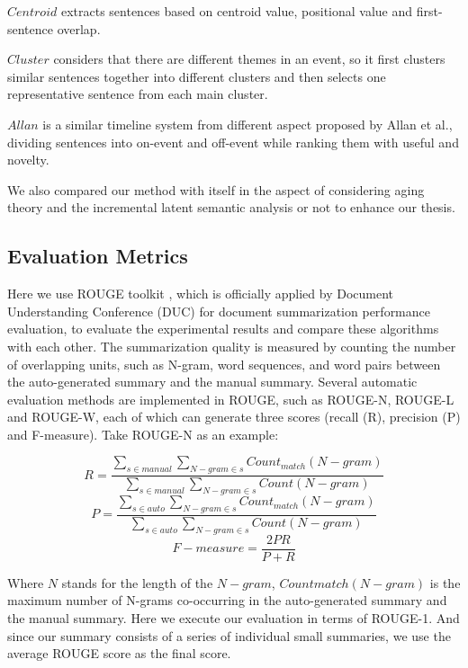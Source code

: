 \documentclass[runningheads,a4paper]{llncs}
\begin{document}
$Centroid$ extracts sentences based on centroid value, positional value and first-sentence overlap.

$Cluster$ considers that there are different themes in an event, so it first clusters similar sentences together into different clusters and then selects one representative sentence from each main cluster.

$Allan$ is a similar timeline system from different aspect proposed by Allan et al., dividing sentences into on-event and off-event while ranking them with useful and novelty.

We also compared our method with itself in the aspect of considering aging theory and the incremental latent semantic analysis or not to enhance our thesis.

\subsection{Evaluation Metrics}
Here we use ROUGE toolkit \cite{2004-Lin-p74-81} , which is officially applied by Document Understanding Conference (DUC) for document summarization performance evaluation, to evaluate the experimental results and compare these algorithms with each other. The summarization quality is measured by counting the number of overlapping units, such as N-gram, word sequences, and word pairs between the auto-generated summary and the manual summary. Several automatic evaluation methods are implemented in ROUGE, such as ROUGE-N, ROUGE-L and ROUGE-W, each of which can generate three scores (recall (R), precision (P) and F-measure). Take ROUGE-N as an example:

\begin{equation}
R=\frac{\sum_{s \in manual } \sum_{N-gram \in s} Count_{match}(N-gram) } { \sum_{s \in manual} \sum_{N-gram \in s} Count(N-gram)  } \end{equation}
\begin{equation}
P=\frac{\sum_{s \in auto } \sum_{N-gram \in s} Count_{match}(N-gram) } { \sum_{s \in auto} \sum_{N-gram \in s} Count(N-gram)  }
\end{equation}
\begin{equation}
F-measure = \frac{2PR}{P+R}
\end{equation}

Where $N$ stands for the length of the $N-gram$, $Countmatch(N-gram)$ is the maximum number of N-grams co-occurring in the auto-generated summary and the manual summary. Here we execute our evaluation in terms of ROUGE-1. And since our summary consists of a series of individual small summaries, we use the average ROUGE score as the final score.
\end{document}

